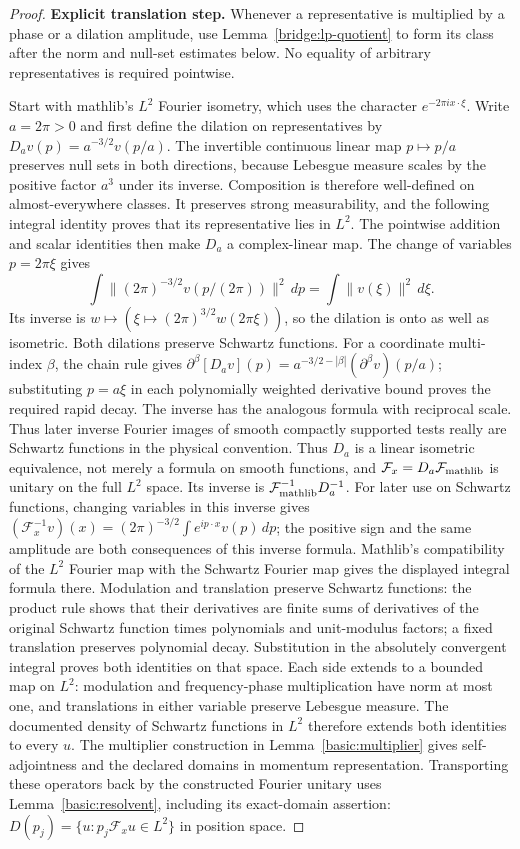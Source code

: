\documentclass[11pt,a4paper]{article}
\theoremstyle{definition}
\theoremstyle{remark}
\begin{document}
\begin{proof}
\noindent\textbf{Explicit translation step.} Whenever a representative is multiplied by a phase or a dilation
amplitude, use Lemma~\ref{bridge:lp-quotient} to form its class after the
norm and null-set estimates below. No equality of arbitrary representatives
is required pointwise.

Start with mathlib's $L^2$ Fourier isometry, which uses the character
$e^{-2\pi i x\cdot\xi}$. Write $a=2\pi>0$ and first define the
dilation on representatives by $D_av(p)=a^{-3/2}v(p/a)$.
The invertible continuous linear map $p\mapsto p/a$ preserves null
sets in both directions, because Lebesgue measure scales by the
positive factor $a^3$ under its inverse. Composition is therefore
well-defined on almost-everywhere classes. It preserves strong
measurability, and the following integral identity proves that its
representative lies in $L^2$. The pointwise addition and scalar
identities then make $D_a$ a complex-linear map. The change of variables
$p=2\pi\xi$ gives
\[
 \int\|(2\pi)^{-3/2}v(p/(2\pi))\|^2\,dp=\int\|v(\xi)\|^2\,d\xi.
\]
Its inverse is $w\mapsto(\xi\mapsto(2\pi)^{3/2}w(2\pi\xi))$,
so the dilation is onto as well as isometric. Both dilations preserve
Schwartz functions. For a coordinate multi-index $\beta$, the chain rule
gives
$\partial^\beta[D_av](p)=a^{-3/2-|\beta|}
(\partial^\beta v)(p/a)$; substituting $p=a\xi$ in each polynomially
weighted derivative bound proves the required rapid decay. The inverse
has the analogous formula with reciprocal scale. Thus later inverse
Fourier images of smooth compactly supported tests really are Schwartz
functions in the physical convention. Thus $D_a$ is a
linear isometric equivalence, not merely a formula on smooth functions,
and $\mathcal F_x=D_a\mathcal F_{\rm mathlib}$ is unitary on the full
$L^2$ space. Its inverse is $\mathcal F_{\rm mathlib}^{-1}D_a^{-1}$.
For later use on Schwartz functions, changing variables in this inverse
gives $(\mathcal F_x^{-1}v)(x)=(2\pi)^{-3/2}
\int e^{ip\cdot x}v(p)\,dp$; the positive sign and the same amplitude
are both consequences of this inverse formula. Mathlib's compatibility
of the $L^2$ Fourier map with the Schwartz Fourier map gives the
displayed integral formula there. Modulation and translation preserve
Schwartz functions: the product rule shows that their derivatives are
finite sums of derivatives of the original Schwartz function times
polynomials and unit-modulus factors; a fixed translation preserves
polynomial decay. Substitution in the absolutely convergent integral
proves both identities on that space. Each side extends to a bounded
map on $L^2$: modulation and frequency-phase multiplication have norm
at most one, and translations in either variable preserve Lebesgue measure.
The documented density of Schwartz functions in $L^2$ therefore extends
both identities to every $u$. The multiplier construction in
Lemma~\ref{basic:multiplier} gives self-adjointness and the declared
domains in momentum representation. Transporting these operators
back by the constructed Fourier unitary uses
Lemma~\ref{basic:resolvent}, including its exact-domain assertion:
$D(p_j)=\{u:p_j\mathcal F_xu\in L^2\}$ in position space.
\end{proof}
\end{document}
